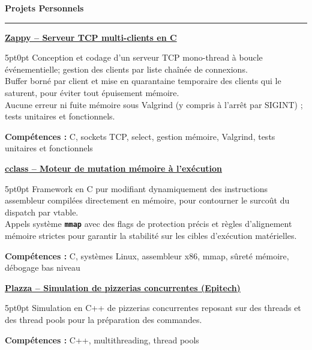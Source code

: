 \documentclass[9pt]{extarticle}
\begin{document}
\par\vspace{5pt}

{\large\bfseries Projets Personnels}
\par\vspace{-8pt}
\rule{\linewidth}{0.4pt}
\par\vspace{5pt}

\underline{\bfseries Zappy -- Serveur TCP multi-clients en C}
\par
\begin{adjustwidth}{5pt}{0pt}
    Conception et codage d'un serveur TCP mono-thread à boucle événementielle; gestion des clients par liste chaînée de connexions. \\
    Buffer borné par client et mise en quarantaine temporaire des clients qui le saturent, pour éviter tout épuisement mémoire. \\
    Aucune erreur ni fuite mémoire sous Valgrind (y compris à l'arrêt par SIGINT) ; tests unitaires et fonctionnels.
\end{adjustwidth}
\par
{\bfseries Compétences :} C, sockets TCP, select, gestion mémoire, Valgrind, tests unitaires et fonctionnels

\par\vspace{8pt}

\underline{\bfseries \href{https://github.com/paulogarithm/cclass}{cclass} -- Moteur de mutation mémoire à l'exécution}
\par
\begin{adjustwidth}{5pt}{0pt}
    Framework en C pur modifiant dynamiquement des instructions assembleur compilées directement en mémoire, pour contourner le surcoût du dispatch par vtable. \\
    Appels système {\bfseries \texttt{mmap}} avec des flags de protection précis et règles d'alignement mémoire strictes pour garantir la stabilité sur les cibles d'exécution matérielles.
\end{adjustwidth}
\par
{\bfseries Compétences :} C, systèmes Linux, assembleur x86, mmap, sûreté mémoire, débogage bas niveau

\par\vspace{8pt}

\underline{\bfseries Plazza -- Simulation de pizzerias concurrentes (Epitech)}
\par
\begin{adjustwidth}{5pt}{0pt}
    Simulation en C++ de pizzerias concurrentes reposant sur des threads et des thread pools pour la préparation des commandes.
\end{adjustwidth}
\par
{\bfseries Compétences :} C++, multithreading, thread pools
\end{document}
